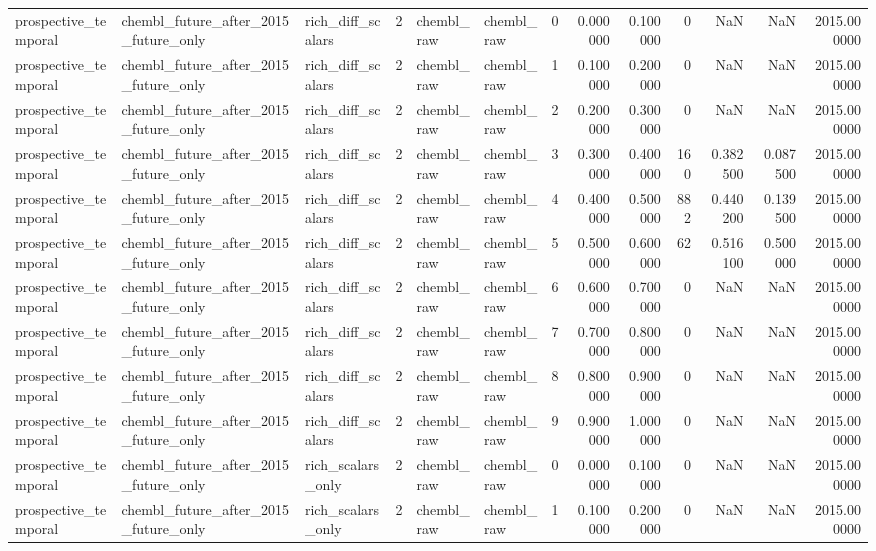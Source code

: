 \begin{longtable}{lllrllrrrrrrr}
prospective\_temporal & chembl\_future\_after\_2015\_future\_only & rich\_diff\_scalars & 2 & chembl\_raw & chembl\_raw & 0 & 0.000000 & 0.100000 & 0 & NaN & NaN & 2015.000000 \\
prospective\_temporal & chembl\_future\_after\_2015\_future\_only & rich\_diff\_scalars & 2 & chembl\_raw & chembl\_raw & 1 & 0.100000 & 0.200000 & 0 & NaN & NaN & 2015.000000 \\
prospective\_temporal & chembl\_future\_after\_2015\_future\_only & rich\_diff\_scalars & 2 & chembl\_raw & chembl\_raw & 2 & 0.200000 & 0.300000 & 0 & NaN & NaN & 2015.000000 \\
prospective\_temporal & chembl\_future\_after\_2015\_future\_only & rich\_diff\_scalars & 2 & chembl\_raw & chembl\_raw & 3 & 0.300000 & 0.400000 & 160 & 0.382500 & 0.087500 & 2015.000000 \\
prospective\_temporal & chembl\_future\_after\_2015\_future\_only & rich\_diff\_scalars & 2 & chembl\_raw & chembl\_raw & 4 & 0.400000 & 0.500000 & 882 & 0.440200 & 0.139500 & 2015.000000 \\
prospective\_temporal & chembl\_future\_after\_2015\_future\_only & rich\_diff\_scalars & 2 & chembl\_raw & chembl\_raw & 5 & 0.500000 & 0.600000 & 62 & 0.516100 & 0.500000 & 2015.000000 \\
prospective\_temporal & chembl\_future\_after\_2015\_future\_only & rich\_diff\_scalars & 2 & chembl\_raw & chembl\_raw & 6 & 0.600000 & 0.700000 & 0 & NaN & NaN & 2015.000000 \\
prospective\_temporal & chembl\_future\_after\_2015\_future\_only & rich\_diff\_scalars & 2 & chembl\_raw & chembl\_raw & 7 & 0.700000 & 0.800000 & 0 & NaN & NaN & 2015.000000 \\
prospective\_temporal & chembl\_future\_after\_2015\_future\_only & rich\_diff\_scalars & 2 & chembl\_raw & chembl\_raw & 8 & 0.800000 & 0.900000 & 0 & NaN & NaN & 2015.000000 \\
prospective\_temporal & chembl\_future\_after\_2015\_future\_only & rich\_diff\_scalars & 2 & chembl\_raw & chembl\_raw & 9 & 0.900000 & 1.000000 & 0 & NaN & NaN & 2015.000000 \\
prospective\_temporal & chembl\_future\_after\_2015\_future\_only & rich\_scalars\_only & 2 & chembl\_raw & chembl\_raw & 0 & 0.000000 & 0.100000 & 0 & NaN & NaN & 2015.000000 \\
prospective\_temporal & chembl\_future\_after\_2015\_future\_only & rich\_scalars\_only & 2 & chembl\_raw & chembl\_raw & 1 & 0.100000 & 0.200000 & 0 & NaN & NaN & 2015.000000 \\

\end{longtable}

